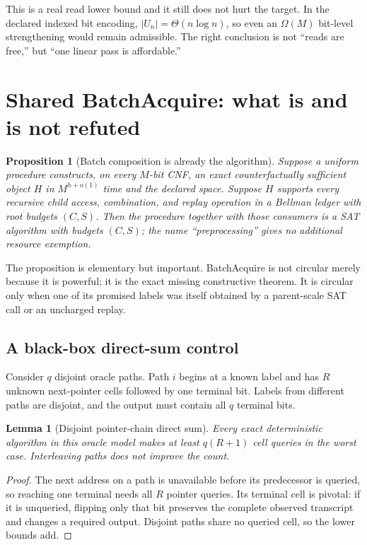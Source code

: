 \documentclass[11pt]{article}
\newtheorem{lemma}[theorem]{Lemma}
\newtheorem{proposition}[theorem]{Proposition}
\begin{document}
This is a real read lower bound and it still does not hurt the target.  In the
declared indexed bit encoding, $|U_n|=\Theta(n\log n)$, so even an
$\Omega(M)$ bit-level strengthening would remain admissible.  The right
conclusion is not ``reads are free,'' but ``one linear pass is affordable.''

\section{Shared BatchAcquire: what is and is not refuted}

\begin{proposition}[Batch composition is already the algorithm]
Suppose a uniform procedure constructs, on every $M$-bit CNF, an exact
counterfactually sufficient object $H$ in $M^{h+o(1)}$ time and the declared
space.  Suppose $H$ supports every recursive child access, combination, and
replay operation in a Bellman ledger with root budgets $(C,S)$.  Then the
procedure together with those consumers is a SAT algorithm with budgets
$(C,S)$; the name ``preprocessing'' gives no additional resource exemption.
\end{proposition}

The proposition is elementary but important.  BatchAcquire is not circular
merely because it is powerful; it is the exact missing constructive theorem.
It is circular only when one of its promised labels was itself obtained by a
parent-scale SAT call or an uncharged replay.

\subsection{A black-box direct-sum control}

Consider $q$ disjoint oracle paths.  Path $i$ begins at a known label and has
$R$ unknown next-pointer cells followed by one terminal bit.  Labels from
different paths are disjoint, and the output must contain all $q$ terminal
bits.

\begin{lemma}[Disjoint pointer-chain direct sum]
Every exact deterministic algorithm in this oracle model makes at least
$q(R+1)$ cell queries in the worst case.  Interleaving paths does not improve
the count.
\end{lemma}

\begin{proof}
The next address on a path is unavailable before its predecessor is queried,
so reaching one terminal needs all $R$ pointer queries.  Its terminal cell is
pivotal: if it is unqueried, flipping only that bit preserves the complete
observed transcript and changes a required output.  Disjoint paths share no
queried cell, so the lower bounds add.
\end{proof}
\end{document}
